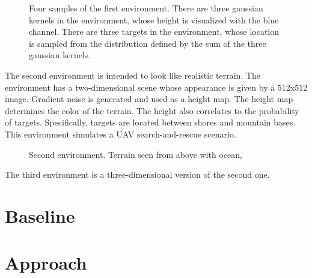 \begin{figure}
    \centering
    
    \label{fig:gaussian}
    \caption[Gaussian environment]{Four samples of the first environment. There are three gaussian kernels in the environment, whose height is visualized with the blue channel. There are three targets in the environment, whose location is sampled from the distribution defined by the sum of the three gaussian kernels.}
\end{figure}

The second environment is intended to look like realistic terrain.
The environment has a two-dimensional scene whose appearance is given by a 512x512 image.
Gradient noise is generated and used as a height map.
The height map determines the color of the terrain.
The height also correlates to the probability of targets.
Specifically, targets are located between shores and mountain bases.
This environment simulates a UAV search-and-rescue scenario.

\begin{figure}
    \centering
    
    \label{fig:terrain}
    \caption[Terrain environment]{Second environment. Terrain seen from above with ocean, }
\end{figure}

The third environment is a three-dimensional version of the second one.



\section{Baseline}
\label{sec:baseline}

\section{Approach}
\label{sec:approach}



